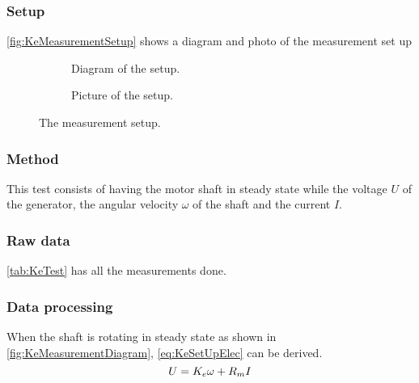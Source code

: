 \subsubsection*{Setup}
\autoref{fig:KeMeasurementSetup} shows a diagram and photo of the measurement set up
\begin{figure}[htbp]
	\centering
	\begin{subfigure}{0.50\textwidth}
		\caption{Diagram of the setup.} \label{fig:KeMeasurementDiagram}
	\end{subfigure}
	\begin{subfigure}{0.40\textwidth}
		\caption{Picture of the setup.} \label{fig:KeMeasurementPictures}
	\end{subfigure}
	\caption{The measurement setup.} \label{fig:KeMeasurementSetup}   
\end{figure}

\subsubsection*{Method}
This test consists of having the motor shaft in steady state while the voltage $U$ of the generator, the angular velocity $\omega$ of the shaft and the current $I$.

\subsubsection*{Raw data}
\autoref{tab:KeTest} has all the measurements done.


\subsubsection*{Data processing}

When the shaft is rotating in steady state as shown in \autoref{fig:KeMeasurementDiagram}, \autoref{eq:KeSetUpElec} can be derived.
\begin{equation}
U=K_e\omega+R_m I \addunit{V}
\label{eq:KeSetUpElec}
\end{equation}
\startexplain
{}
\stopexplain

